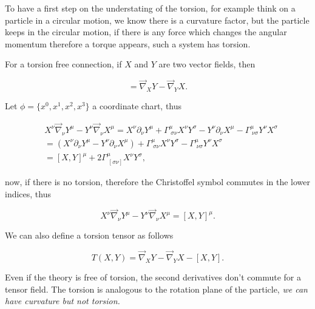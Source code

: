         To have a first step on the understating of the torsion, for example think on a particle in a circular motion, we know there is a curvature factor, but the particle keeps in the circular motion, if there is any force which changes the angular momentum therefore a torque appears, such a system has torsion.

        \begin{myteo}
            For a torsion free connection, if $X$ and $Y$ are two vector fields, then

            \begin{equation}
                [X,Y] = \Vec{\nabla}_XY-\Vec{\nabla}_YX.
            \end{equation}
        \end{myteo}

        Let $\phi = \{x^0,x^1,x^2,x^3\}$ a coordinate chart, thus

        \begin{align*}
            &X^{\nu}\Vec{\nabla}_{\nu}Y^{\mu}-Y^{\nu}\Vec{\nabla}_{\nu}X^{\mu} = X^{\nu}\partial_{\nu}Y^{\mu}+\Gamma^{\mu}_{\;\sigma\nu}X^{\nu}Y^{\sigma}-Y^{\nu}\partial_{\nu}X^{\mu} - \Gamma^{\mu}_{\;\nu\sigma}Y^{\nu}X^{\sigma} \\
            &= \left(X^{\nu}\partial_{\nu}Y^{\mu} -Y^{\nu}\partial_{\nu}X^{\mu} \right) +\Gamma^{\mu}_{\;\sigma\nu}X^{\nu}Y^{\sigma}  - \Gamma^{\mu}_{\;\nu\sigma}Y^{\nu}X^{\sigma}\\
            &= [X,Y]^{\mu} + 2\Gamma^{\mu}_{\;[\sigma\nu]}X^{\nu}Y^{\sigma},
        \end{align*}

        now, if there is no torsion, therefore the Christoffel symbol commutes in the lower indices, thus

        \begin{equation}
            X^{\nu}\Vec{\nabla}_{\nu}Y^{\mu}-Y^{\nu}\Vec{\nabla}_{\nu}X^{\mu} =  [X,Y]^{\mu}.\label{eq:LieCommutatorNabla}
        \end{equation}

        We can also define a torsion tensor as follows

        \begin{equation}
            T(X,Y) = \Vec{\nabla}_XY - \Vec{\nabla}_YX - [X,Y].
        \end{equation}

        Even if the theory is free of torsion, the second derivatives don't commute for a tensor field. The torsion is analogous to the rotation plane of the particle, \textit{we can have curvature but not torsion.}

